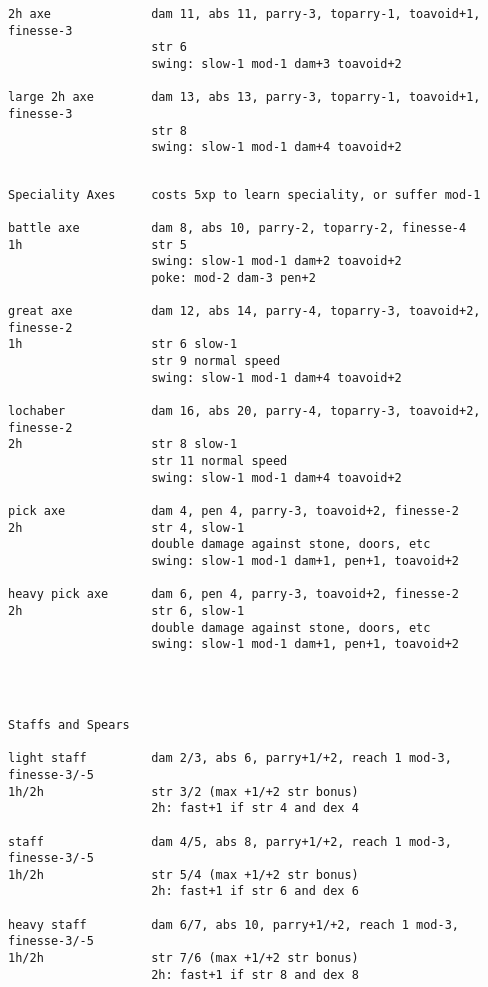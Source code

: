 \begin{verbatim}
2h axe              dam 11, abs 11, parry-3, toparry-1, toavoid+1, finesse-3
                    str 6
                    swing: slow-1 mod-1 dam+3 toavoid+2

large 2h axe        dam 13, abs 13, parry-3, toparry-1, toavoid+1, finesse-3
                    str 8
                    swing: slow-1 mod-1 dam+4 toavoid+2


\end{verbatim} \pagebreak[1] \begin{verbatim}
Speciality Axes     costs 5xp to learn speciality, or suffer mod-1

battle axe          dam 8, abs 10, parry-2, toparry-2, finesse-4
1h                  str 5
                    swing: slow-1 mod-1 dam+2 toavoid+2
                    poke: mod-2 dam-3 pen+2

great axe           dam 12, abs 14, parry-4, toparry-3, toavoid+2, finesse-2
1h                  str 6 slow-1
                    str 9 normal speed
                    swing: slow-1 mod-1 dam+4 toavoid+2

lochaber            dam 16, abs 20, parry-4, toparry-3, toavoid+2, finesse-2
2h                  str 8 slow-1
                    str 11 normal speed
                    swing: slow-1 mod-1 dam+4 toavoid+2

pick axe            dam 4, pen 4, parry-3, toavoid+2, finesse-2
2h                  str 4, slow-1
                    double damage against stone, doors, etc
                    swing: slow-1 mod-1 dam+1, pen+1, toavoid+2

heavy pick axe      dam 6, pen 4, parry-3, toavoid+2, finesse-2
2h                  str 6, slow-1
                    double damage against stone, doors, etc
                    swing: slow-1 mod-1 dam+1, pen+1, toavoid+2




\end{verbatim} \pagebreak[3] \begin{verbatim}
Staffs and Spears

light staff         dam 2/3, abs 6, parry+1/+2, reach 1 mod-3, finesse-3/-5
1h/2h               str 3/2 (max +1/+2 str bonus)
                    2h: fast+1 if str 4 and dex 4

staff               dam 4/5, abs 8, parry+1/+2, reach 1 mod-3, finesse-3/-5
1h/2h               str 5/4 (max +1/+2 str bonus)
                    2h: fast+1 if str 6 and dex 6

heavy staff         dam 6/7, abs 10, parry+1/+2, reach 1 mod-3, finesse-3/-5
1h/2h               str 7/6 (max +1/+2 str bonus)
                    2h: fast+1 if str 8 and dex 8


\end{verbatim}
